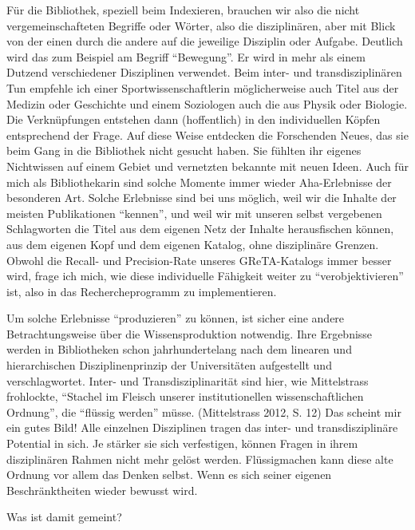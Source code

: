 Für die Bibliothek, speziell beim Indexieren, brauchen wir also die
nicht vergemeinschafteten Begriffe oder Wörter, also die disziplinären,
aber mit Blick von der einen durch die andere auf die jeweilige
Disziplin oder Aufgabe. Deutlich wird das zum Beispiel am Begriff
\enquote{Bewegung}. Er wird in mehr als einem Dutzend verschiedener
Disziplinen verwendet. Beim inter- und transdisziplinären Tun empfehle
ich einer Sportwissenschaftlerin möglicherweise auch Titel aus der
Medizin oder Geschichte und einem Soziologen auch die aus Physik oder
Biologie. Die Verknüpfungen entstehen dann (hoffentlich) in den
individuellen Köpfen entsprechend der Frage. Auf diese Weise entdecken
die Forschenden Neues, das sie beim Gang in die Bibliothek nicht gesucht
haben. Sie fühlten ihr eigenes Nichtwissen auf einem Gebiet und
vernetzten bekannte mit neuen Ideen. Auch für mich als Bibliothekarin
sind solche Momente immer wieder Aha-Erlebnisse der besonderen Art.
Solche Erlebnisse sind bei uns möglich, weil wir die Inhalte der meisten
Publikationen \enquote{kennen}, und weil wir mit unseren selbst
vergebenen Schlagworten die Titel aus dem eigenen Netz der Inhalte
herausfischen können, aus dem eigenen Kopf und dem eigenen Katalog, ohne
disziplinäre Grenzen. Obwohl die Recall- und Precision-Rate unseres
GReTA-Katalogs immer besser wird, frage ich mich, wie diese individuelle
Fähigkeit weiter zu \enquote{verobjektivieren} ist, also in das
Rechercheprogramm zu implementieren.

Um solche Erlebnisse \enquote{produzieren} zu können, ist sicher eine andere
Betrachtungsweise über die Wissensproduktion notwendig. Ihre Ergebnisse
werden in Bibliotheken schon jahrhundertelang nach dem linearen und
hierarchischen Disziplinenprinzip der Universitäten aufgestellt und
verschlagwortet. Inter- und Transdisziplinarität sind hier, wie
Mittelstrass frohlockte, \enquote{Stachel im Fleisch unserer
institutionellen wissenschaftlichen Ordnung}, die \enquote{flüssig
werden} müsse. (Mittelstrass 2012, S. 12) Das scheint mir ein gutes
Bild! Alle einzelnen Disziplinen tragen das inter- und transdisziplinäre
Potential in sich. Je stärker sie sich verfestigen, können Fragen in
ihrem disziplinären Rahmen nicht mehr gelöst werden. Flüssigmachen kann
diese alte Ordnung vor allem das Denken selbst. Wenn es sich seiner
eigenen Beschränktheiten wieder bewusst wird.

Was ist damit gemeint?

